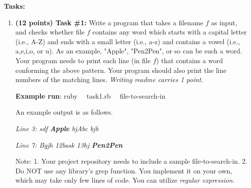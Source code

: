 \documentclass[paper=letter, fontsize=11pt]{scrartcl} %
\begin{document}
    \textbf{Tasks:}
    \begin{enumerate}[noitemsep]
        \item \textbf{(12 points) Task \#1:} Write a program that takes 
a filename $f$ as input, and checks whether file $f$ contains any word 
which starts with a capital letter (i.e., A-Z) and ends with a small letter (i.e., a-z) 
and contains a vowel (i.e., a,e,i,o, or u). 
As an example, "Apple", "Pen2Pen", or so can be such a word.
Your program needs to print each line (in file $f$) that contains a word 
conforming the above pattern. 
Your program should also print the line numbers of the matching lines.
\emph{Writing readme carries 1 point.}

\textbf{Example run}: ruby $~~~$  task1.rb $~~~$ file-to-search-in $~~~$ 

An example output is as follows.

\emph{Line 3: sdf \textbf{Apple} bjAbc bjb}

\emph{Line 7: Bgjh 12bask 13hj \textbf{Pen2Pen}} 


Note: 1. Your project repository needs to include a sample file-to-search-in. 2. Do NOT use any library's grep function. You implement it on your own, which may take only few lines of code. You can utilize \emph{regular expression}.
      

\end{enumerate}
\end{document}
